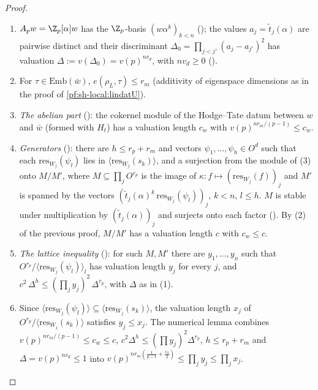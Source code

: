 \begin{proof}
\begin{enumerate}[label=(\arabic*)]
\item $A_pw=\Z_p[\alpha]w$ has the $\Z_p$-basis $(w\alpha^k)_{k<n}$
(); the values $a_j=\tilde t_j(\alpha)$ are pairwise distinct and
their discriminant $\Delta_0=\prod_{j<j'}(a_j-a_{j'})^2$ has valuation $\Delta:=v(\Delta_0)=v(p)^{nv_d}$, with
$nv_d\ge0$ ().
\item For $\tau\in\mathrm{Emb}(\bar w)$, $e(\rho_L,\tau)\le r_m$ (additivity of eigenspace dimensions as in the proof
of \cref{pf:sh-local:lindatU}).
\item \emph{The abelian part} (): the cokernel module of the
Hodge--Tate datum between $w$ and $\bar w$ (formed with $H_t$) has a valuation length $c_w$ with
$v(p)^{nr_m/(p-1)}\le c_w$.
\item \emph{Generators} (): there are $h\le r_p+r_m$
and vectors $\psi_1,\dots,\psi_h\in O^d$ such that each $\mathrm{res}_{W_j}(\psi_l)$ lies in
$\langle\mathrm{res}_{W_j}(s_k)\rangle$, and a surjection from the module of (3) onto $M/M'$, where
$M\subseteq\prod_jO^{r_p}$ is the image of $\kappa:f\mapsto(\mathrm{res}_{W_j}(f))_j$ and $M'$ is spanned by the vectors
$(\tilde t_j(\alpha)^k\,\mathrm{res}_{W_j}(\psi_l))_j$, $k<n$, $l\le h$. $M$ is stable under multiplication by
$(\tilde t_j(\alpha))_j$ and surjects onto each factor (). By (2) of the
previous proof, $M/M'$ has a valuation length $c$ with $c_w\le c$.
\item \emph{The lattice inequality} (): for such
$M,M'$ there are $y_1,\dots,y_n$ such that $O^{r_p}/\langle\mathrm{res}_{W_j}(\psi_l)\rangle_l$ has valuation length
$y_j$ for every $j$, and $c^2\,\Delta^h\le(\prod_jy_j)^2\,\Delta^{r_p}$, with $\Delta$ as in (1).
\item Since $\langle\mathrm{res}_{W_j}(\psi_l)\rangle\subseteq\langle\mathrm{res}_{W_j}(s_k)\rangle$, the valuation
length $x_j$ of $O^{r_p}/\langle\mathrm{res}_{W_j}(s_k)\rangle$ satisfies $y_j\le x_j$. The numerical lemma
 combines $v(p)^{nr_m/(p-1)}\le c_w\le c$, $c^2\Delta^h\le(\prod y_j)^2\Delta^{r_p}$,
$h\le r_p+r_m$ and $\Delta=v(p)^{nv_d}\le1$ into $v(p)^{nr_m(\frac1{p-1}+\frac{v_d}2)}\le\prod_jy_j\le\prod_jx_j$.
\end{enumerate}
\end{proof}

